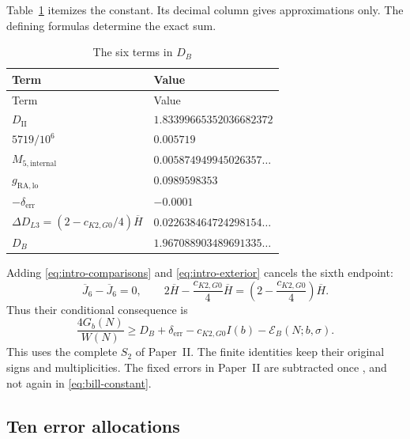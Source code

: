 Table~\ref{tab:bill-components} itemizes the constant.
Its decimal column gives approximations only.
The defining formulas determine the exact sum.
\begingroup
\small
\renewcommand{\arraystretch}{1.3}
\begin{longtable}{@{}p{.48\linewidth}p{.43\linewidth}@{}}
\caption{The six terms in $D_B$}\label{tab:bill-components}\\
\hline
Term & Value\\
\hline
\endfirsthead
\hline
Term & Value\\
\hline
\endhead
$D_{\mathrm{II}}$ & $1.83399665352036682372$\\
$5719/10^6$ & $0.005719$\\
$M_{5,\mathrm{internal}}$ & $0.005874949945026357\ldots$\\
$g_{\mathrm{RA,lo}}$ & $0.0989598353$\\
$-\delta_{\mathrm{err}}$ & $-0.0001$\\
$\Delta D_{L3}=(2-c_{K2,G0}/4)\overline H$
 & $0.022638464724298154\ldots$\\
\hline
$D_B$ & $1.967088903489691335\ldots$\\
\hline
\end{longtable}
\endgroup

Adding \eqref{eq:intro-comparisons} and
\eqref{eq:intro-exterior} cancels the sixth endpoint:
\begin{equation}\label{eq:bill-cancellation}
 \overline J_6-\overline J_6=0,\qquad
 2\overline H-\frac{c_{K2,G0}}{4}\overline H
 =\left(2-\frac{c_{K2,G0}}{4}\right)\overline H.
\end{equation}
Thus their conditional consequence is
\begin{equation}\label{eq:bill-added}
 \frac{4G_b(N)}{W(N)}
 \ge D_B+\delta_{\mathrm{err}}-c_{K2,G0}I(b)-\mathcal E_B(N;b,\sigma).
\end{equation}
This uses the complete $S_2$ of Paper~II.
The finite identities keep their original signs and multiplicities.
The fixed errors in Paper~II are subtracted once
\cite[(6.4)--(6.6)]{PaperII},
and not again in \eqref{eq:bill-constant}.

\subsection{Ten error allocations}

